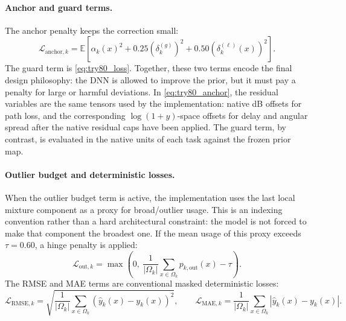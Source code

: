 \paragraph{Anchor and guard terms.}
The anchor penalty keeps the correction small:
\begin{equation}
\mathcal{L}_{\mathrm{anchor},k}
=
\mathbb{E}
\left[
\alpha_k(x)^2
+
0.25\left(\delta^{(g)}_k\right)^2
+
0.50\left(\delta^{(\ell)}_k(x)\right)^2
\right].
\label{eq:try80_anchor}
\end{equation}
The guard term is \eqref{eq:try80_loss}. Together, these two terms encode
the final design philosophy: the DNN is allowed to improve the
prior, but it must pay a penalty for large or harmful deviations.
In \eqref{eq:try80_anchor}, the residual variables are the same tensors
used by the implementation: native dB offsets for path loss, and the
corresponding \(\log(1+y)\)-space offsets for delay and angular spread after
the native residual caps have been applied. The guard term, by contrast, is
evaluated in the native units of each task against the frozen prior map.

\paragraph{Outlier budget and deterministic losses.}
When the outlier budget term is active, the implementation uses the last local
mixture component as a proxy for broad/outlier usage. This is an indexing
convention rather than a hard architectural constraint: the model is not forced
to make that component the broadest one. If the mean usage of this proxy exceeds
\(\tau=0.60\), a hinge penalty is applied:
\begin{equation}
\mathcal{L}_{\mathrm{out},k}
=
\max\left(
0,\
\frac{1}{|\Omega_k|}
\sum_{x\in\Omega_k}
p_{k,\mathrm{out}}(x)
-
\tau
\right).
\label{eq:try80_outlier}
\end{equation}
The RMSE and MAE terms are conventional masked deterministic losses:
\begin{equation}
\mathcal{L}_{\mathrm{RMSE},k}
=
\sqrt{
\frac{1}{|\Omega_k|}
\sum_{x\in\Omega_k}
\left(\hat y_k(x)-y_k(x)\right)^2
},
\qquad
\mathcal{L}_{\mathrm{MAE},k}
=
\frac{1}{|\Omega_k|}
\sum_{x\in\Omega_k}
\left|\hat y_k(x)-y_k(x)\right|.
\label{eq:try80_rmse_mae_loss}
\end{equation}


